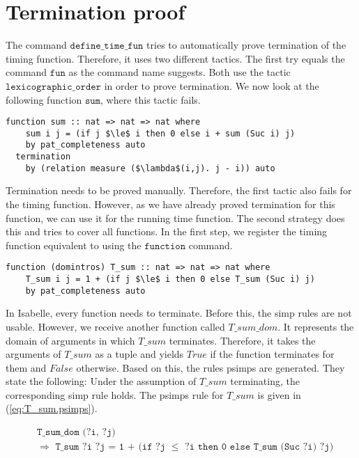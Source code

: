 

\section{Termination proof} \label{chapter:termination}

The command $\texttt{define\_time\_fun}$ tries to automatically prove termination of the timing function.
Therefore, it uses two different tactics.
The first try equals the command $\texttt{fun}$ as the command name suggests.
Both use the tactic $\texttt{lexicographic\_order}$ in order to prove termination.
We now look at the following function $\texttt{sum}$, where this tactic fails.
\begin{lstlisting}[language=isabelle,mathescape=true]
  function sum :: nat => nat => nat where
    sum i j = (if j $\le$ i then 0 else i + sum (Suc i) j)
    by pat_completeness auto
  termination
    by (relation measure ($\lambda$(i,j). j - i)) auto
\end{lstlisting}

Termination needs to be proved manually.
Therefore, the first tactic also fails for the timing function.
However, as we have already proved termination for this function, we can use it for the running time function.
The second strategy does this and tries to cover all functions.
In the first step, we register the timing function equivalent to using the $\texttt{function}$ command.
\begin{lstlisting}[language=isabelle,mathescape=true,caption=Function registration,label=lst:sum_reg]
  function (domintros) T_sum :: nat => nat => nat where
    T_sum i j = 1 + (if j $\le$ i then 0 else T_sum (Suc i) j)
    by pat_completeness auto
\end{lstlisting}
In Isabelle, every function needs to terminate.
Before this, the simp rules are not usable.
However, we receive another function called $T\_sum\_dom$.
It represents the domain of arguments in which $T\_sum$ terminates.
Therefore, it takes the arguments of $T\_sum$ as a tuple and yields $True$ if the function terminates for them and $False$ otherwise.
Based on this, the rules psimps are generated.
They state the following: Under the assumption of $T\_sum$ terminating, the corresponding simp rule holds.
The psimps rule for $T\_sum$ is given in (\ref{eq:T_sum.psimps}).

\begin{equation}
  \begin{aligned}
  &\texttt{T\_sum\_dom (?i, ?j)}\\
  &\texttt{$\Longrightarrow$ T\_sum ?i ?j = 1 + (if ?j $\le$ ?i then 0 else T\_sum (Suc ?i) ?j)}
  \end{aligned}
  \label{eq:T_sum.psimps}
\end{equation}

